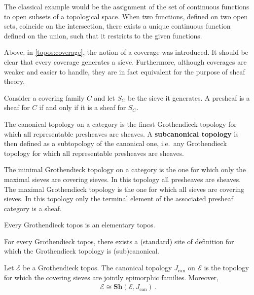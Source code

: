 \begin{example}
        The classical example would be the assignment of the set of continuous functions to open subsets of a topological space. When two functions, defined on two open sets, coincide on the intersection, there exists a unique continuous function defined on the union, such that it restricts to the given functions.
    \end{example}

    Above, in \cref{topos:coverage}, the notion of a coverage was introduced. It should be clear that every coverage generates a sieve. Furthermore, although coverages are weaker and easier to handle, they are in fact equivalent for the purpose of sheaf theory.
    \begin{property}
        Consider a covering family $C$ and let $S_C$ be the sieve it generates. A presheaf is a sheaf for $C$ if and only if it is a sheaf for $S_C$.
    \end{property}

    \begin{example}
        The canonical topology on a category is the finest Grothendieck topology for which all representable presheaves are sheaves. A \textbf{subcanonical topology} is then defined as a subtopology of the canonical one, i.e.~any Grothendieck topology for which all representable presheaves are sheaves.
    \end{example}
    \begin{example}
        The minimal Grothendieck topology on a category is the one for which only the maximal sieves are covering sieves. In this topology all presheaves are sheaves. The maximal Grothendieck topology is the one for which all sieves are covering sieves. In this topology only the terminal element of the associated presheaf category is a sheaf.
    \end{example}

    \begin{property}
        Every Grothendieck topos is an elementary topos.
    \end{property}

    \begin{property}
        For every Grothendieck topos, there exists a (standard) site of definition for which the Grothendieck topology is (sub)canonical.
    \end{property}
    \begin{property}
        Let $\mathcal{E}$ be a Grothendieck topos. The canonical topology $J_{\text{can}}$ on $\mathcal{E}$ is the topology for which the covering sieves are jointly epimorphic families. Moreover,
        \begin{gather}
            \mathcal{E}\cong\mathbf{Sh}(\mathcal{E},J_{\text{can}})\,.
        \end{gather}
    \end{property}


